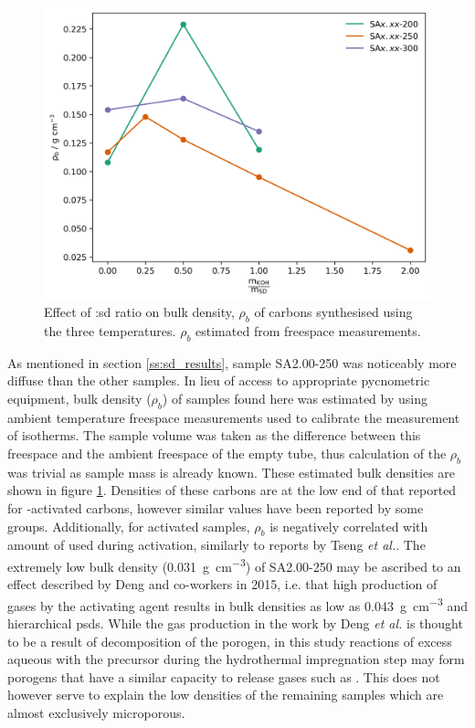 \begin{figure}[b!]
    \centering
    \includegraphics[width=\columnwidth, keepaspectratio]{4-impregnation/figs/SD_density.png}
    \caption{Effect of :\acrshort{sd} ratio on bulk density, $\rho_b$ of carbons synthesised using the three  temperatures. $\rho_b$ estimated from freespace measurements.}
    \label{fig:SA_density}
\end{figure}

As mentioned in section \ref{ss:sd_results}, sample SA2.00-250 was noticeably more diffuse than the other samples. In lieu of access to appropriate pycnometric equipment, bulk density ($\rho_{b}$) of samples found here was estimated by using ambient temperature  freespace measurements used to calibrate the measurement of  isotherms. The sample volume was taken as the difference between this freespace and the ambient freespace of the empty tube, thus calculation of the $\rho_{b}$ was trivial as sample mass is already known. These estimated bulk densities are shown in figure \ref{fig:SA_density}. Densities of these carbons are at the low end of that  reported for -activated carbons,\citep{casco2015very, machnikowski2012adsorption, Altwala2020Predictable} however similar values have been reported by some groups.\citep{tseng2008effects, rashid2016koh, Guan2011Methane} Additionally, for  activated samples, $\rho_b$ is negatively correlated with amount of  used during activation, similarly to reports by Tseng \textit{et al.}.\citep{tseng2008effects} The extremely low bulk density (\qty{0.031}{\gram\per\cm\cubed}) of SA2.00-250 may be ascribed to an effect described by Deng and co-workers in 2015, i.e. that high production of gases by the activating agent results in bulk densities as low as \qty{0.043}{\gram\per\cm\cubed} and hierarchical \glspl{psd}.\citep{Deng2015Inspired} While the gas production in the work by Deng \textit{et al.} is thought to be a result of decomposition of the  \gls{porogen}, in this study reactions of excess aqueous  with the precursor during the hydrothermal impregnation step may form \glspl{porogen} that have a similar capacity to release gases such as . This does not however serve to explain the low densities of the remaining samples which are almost exclusively microporous. 

